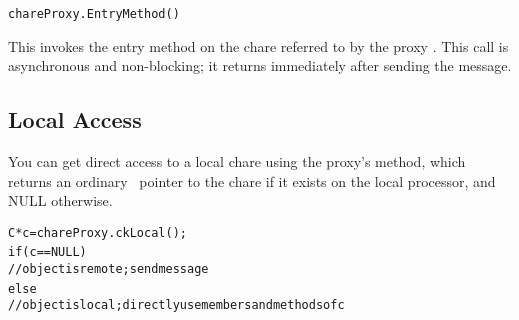 \begin{alltt}
    chareProxy.EntryMethod()
\end{alltt}

This invokes the entry method  on the chare referred
to by the proxy . This call
is asynchronous and non-blocking; it returns immediately after sending the
message. 


\subsection{Local Access}

You can get direct access to a local chare using the
proxy's  method, which returns an ordinary \CC\ pointer
to the chare if it exists on the local processor, and NULL otherwise.

\begin{alltt}
    C *c=chareProxy.ckLocal();
    if (c==NULL) {
        // object is remote; send message
    } else {
        // object is local; directly use members and methods of c
    }
\end{alltt}

